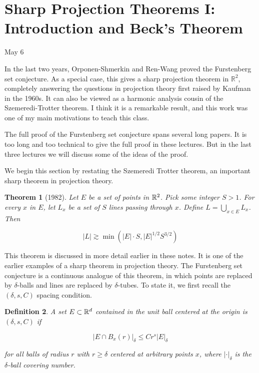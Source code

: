 \documentclass[12pt]{amsart}
\newtheorem{theorem}{Theorem}[section]
\newtheorem{Definition}[theorem]{Definition}
\newcommand{\RR}{\mathbb{R}}
\begin{document}
\newpage

\section{Sharp Projection Theorems I: Introduction and Beck's Theorem}

May 6

In the last two years, Orponen-Shmerkin and Ren-Wang proved the Furstenberg set conjecture.   As a special case, this gives a sharp projection theorem in $\RR^2$,  completely answering the questions in projection theory first raised by Kaufman in the 1960s.   It can also be viewed as a harmonic analysis cousin of the Szemeredi-Trotter theorem.  I think it is a remarkable result,  and this work was one of my main motivations to teach this class.

The full proof of the Furstenberg set conjecture spans several long papers.  It is too long and too technical to give the full proof in these lectures.   But in the last three lectures we will discuss some of the ideas of the proof.   

We begin this section by restating the Szemeredi Trotter theorem, an important sharp theorem in projection theory. 

\begin{theorem}[1982]

    Let $E$ be a set of points in $\mathbb{R}^2$. Pick some integer $S > 1$. For every $x$ in $E$, let $L_x$ be a set of $S$ lines passing through $x$. Define $L = \bigcup_{x\in E} L_x$. Then 
    
    \begin{equation}
        |L| \gtrsim \min(|E|\cdot S, |E|^{1/2} S^{3/2})
    \end{equation}
    
\end{theorem}

This theorem is discussed in more detail earlier in these notes. It is one of the earlier examples of a sharp theorem in projection theory.   The Furstenberg set conjecture is a continuous analogue of this theorem, in which points are replaced by $\delta$-balls and lines are replaced by $\delta$-tubes.   To state it, we first recall the $(\delta, s, C)$ spacing condition. 

\begin{Definition}
    A set $E \subset \mathbb{R}^d$ contained in the unit ball centered at the origin is $(\delta, s, C)$ if 

    \begin{equation}
        |E \cap B_x(r)|_{\delta} \leq C r^s |E|_\delta
    \end{equation} 

    for all balls of radius $r$ with $r \geq \delta$ centered at arbitrary points $x$, where $|\cdot |_\delta$ is the $\delta$-ball covering number. 
\end{Definition}
\end{document}

